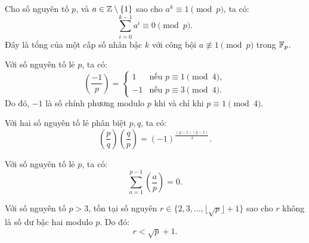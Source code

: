 \documentclass[../imo-training-open-book.tex]{subfiles}
\begin{document}
\begin{theorem}
    \label{theorem:geometric-sum-mod-p}
    Cho số nguyên tố \( p \), và \( a \in \mathbb Z \setminus \{1\} \) sao cho \( a^k \equiv 1 \pmod{p} \), ta có:
    \[
        \sum_{i = 0}^{k - 1} a^i \equiv 0 \pmod{p}.
    \]
    Đây là tổng của một cấp số nhân bậc \( k \) với công bội \( a \not\equiv 1 \pmod{p} \) trong \( \mathbb F_p \).
\end{theorem}

\vspace{1em}

\begin{theorem}
    \label{theorem:square-root-of-minus-one}
    Với số nguyên tố lẻ \( p \), ta có:
    \[
        \left( \frac{-1}{p} \right) = 
        \begin{cases}
            1 & \text{nếu } p \equiv 1 \pmod{4}, \\
            -1 & \text{nếu } p \equiv 3 \pmod{4}.
        \end{cases}
    \]
    Do đó, \( -1 \) là số chính phương modulo \( p \) khi và chỉ khi \( p \equiv 1 \pmod{4} \).
\end{theorem}

\vspace{1em}

\begin{theorem}
    \label{theorem:quadratic-reciprocity}
    Với hai số nguyên tố lẻ phân biệt \( p, q \), ta có:
    \[
        \left( \frac{p}{q} \right) \left( \frac{q}{p} \right) = (-1)^{\frac{(p-1)(q-1)}{4}}.
    \]
\end{theorem}

\vspace{1em}

\begin{corollary*}
    \label{corollary:legendre-sum-zero}
    Với số nguyên tố lẻ \( p \), ta có:
    \[
        \sum_{a = 1}^{p - 1} \left( \frac{a}{p} \right) = 0.
    \]
\end{corollary*}

\vspace{1em}

\begin{theorem}
    \label{theorem:least-quadratic-nonresidue}
    Với số nguyên tố \( p > 3 \), tồn tại số nguyên \( r \in \{2, 3, \ldots, \lfloor \sqrt{p} \rfloor + 1\} \) sao cho \( r \) không là số dư bậc hai modulo \( p \). Do đó:
    \[
        r < \sqrt{p} + 1.
    \]
\end{theorem}
\end{document}
